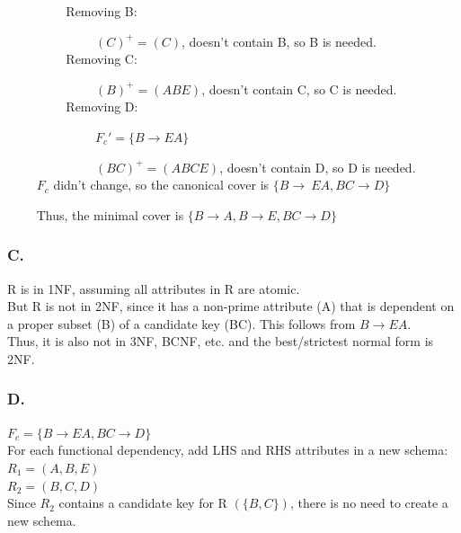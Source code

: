 \documentclass[a4paper]{article}
\begin{document}
	~~~~ ~~~~ Removing B: 
	
	~~~~ ~~~~ ~~~~ $ (C)^+=(C) $, doesn't contain B, so B is needed. \\
		
	~~~~ 	~~~~ Removing C: 
	
	~~~~ ~~~~ ~~~~ $ (B)^+=(ABE) $, doesn't contain C, so C is needed. \\
		
	~~~~ ~~~~ Removing D:
	 
	~~~~ ~~~~ ~~~~ $ F_c'=\{B\rightarrow EA\}$ 
	
	~~~~ ~~~~ ~~~~ $ (BC)^+=(ABCE) $, doesn't contain D, so D is needed. \\
		
	~~~~ $F_c$ didn't change, so the canonical cover is $\{ B \rightarrow\ EA, BC \rightarrow D\}$
	
	
	~~~~ Thus, the minimal cover is $\{ B \rightarrow A, B \rightarrow E, BC \rightarrow D \}$



\subsubsection*{C.}

R is in 1NF, assuming all attributes in R are atomic. \\

But R is not in 2NF, since it has a non-prime attribute (A) that is dependent on a proper subset (B) of a candidate key (BC). This follows from $ B \rightarrow EA $. \\

Thus, it is also not in 3NF, BCNF, etc. and the best/strictest normal form is 2NF.

\subsubsection*{D.}

$ F_c = \{B \rightarrow EA, BC \rightarrow D\} $ \\

For each functional dependency, add LHS and RHS attributes in a new schema: \\

$ R_1 = (A, B, E) $ \\
$ R_2 = (B, C, D) $ \\

Since $R_2$ contains a candidate key for R $(\{B,C\})$, there is no need to create a new schema. \\
\end{document}
